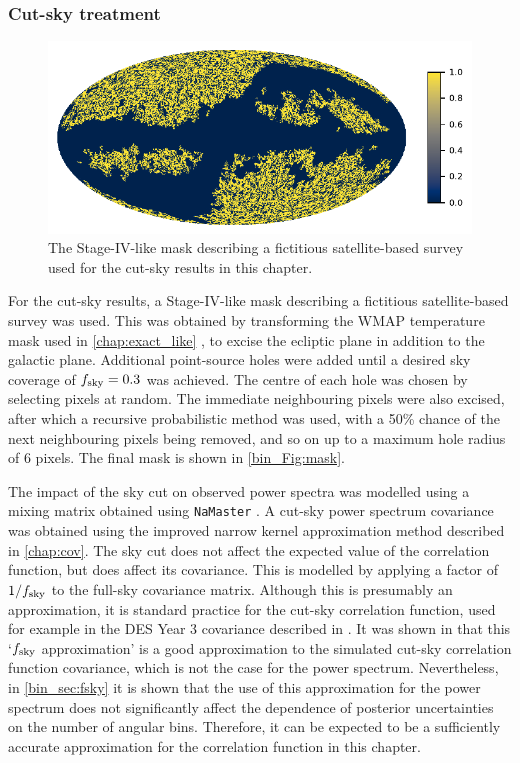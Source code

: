 \subsubsection{Cut-sky treatment}

\begin{figure}[t]
\centering
\includegraphics[width=.7\textwidth]{mask}
\caption{The Stage-IV-like mask describing a fictitious satellite-based survey used for the cut-sky results in this chapter.}
\label{bin_Fig:mask}
\end{figure}

For the cut-sky results, a Stage-IV-like mask describing a fictitious satellite-based survey was used. This was obtained by transforming the WMAP temperature mask used in \autoref{chap:exact_like} \citep{Bennett2013}, to excise the ecliptic plane in addition to the galactic plane. Additional point-source holes were added until a desired sky coverage of $f_\text{sky} = 0.3$ was achieved. The centre of each hole was chosen by selecting pixels at random. The immediate neighbouring pixels were also excised, after which a recursive probabilistic method was used, with a 50\% chance of the next neighbouring pixels being removed, and so on up to a maximum hole radius of 6 pixels. The final mask is shown in \autoref{bin_Fig:mask}.

The impact of the sky cut on observed power spectra was modelled using a mixing matrix obtained using \texttt{NaMaster} \citep{Alonso2019}. A cut-sky power spectrum covariance was obtained using the improved narrow kernel approximation \citep{Nicola2021} method described in \autoref{chap:cov}. The sky cut does not affect the expected value of the correlation function, but does affect its covariance. This is modelled by applying a factor of $1 / f_\text{sky}$ to the full-sky covariance matrix. Although this is presumably an approximation, it is standard practice for the cut-sky correlation function, used for example in the DES Year 3 covariance described in \citet{Friedrich2021}. It was shown in \citet{Cabre2007} that this `$f_\text{sky}$ approximation' is a good approximation to the simulated cut-sky correlation function covariance, which is not the case for the power spectrum. Nevertheless, in \autoref{bin_sec:fsky} it is shown that the use of this approximation for the power spectrum does not significantly affect the dependence of posterior uncertainties on the number of angular bins. Therefore, it can be expected to be a sufficiently accurate approximation for the correlation function in this chapter.

